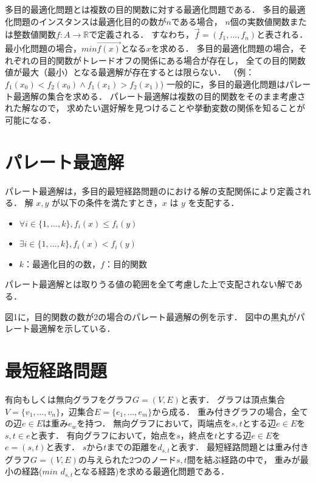 \documentclass[12pt]{optlab-bachelor}
\begin{document}
多目的最適化問題とは複数の目的関数に対する最適化問題である．
多目的最適化問題のインスタンスは最適化目的の数が$n$である場合，
$n$個の実数値関数または整数値関数$f : A \rightarrow \mathbb{R}$で定義される．
すなわち，$\vec{f} = (f_1 , \ldots , f_n)$と表される．
最小化問題の場合，$min\vec{f(x)}$となる$x$を求める．
多目的最適化問題の場合，それぞれの目的関数がトレードオフの関係にある場合が存在し，
全ての目的関数値が最大（最小）となる最適解が存在するとは限らない．
（例：$f_1(x_0) < f_2(x_0) \land f_1(x_1) > f_2(x_1)$)
一般的に，多目的最適化問題はパレート最適解の集合を求める．
パレート最適解は複数の目的関数をそのまま考慮された解なので，
求めたい選好解を見つけることや挙動変数の関係を知ることが可能になる．

\section{パレート最適解}
パレート最適解は，多目的最短経路問題のにおける解の支配関係により定義される．
解 $x,y$ が以下の条件を満たすとき，$x$ は $y$ を支配する．
\begin{itemize}
\item $\forall i \in \{1,\ldots,k\},f_i(x) \le f_i(y)$
\item $\exists i \in \{1,\ldots,k\},f_i(x) < f_i(y)$
\item $k$：最適化目的の数，$f$：目的関数
\end{itemize}
パレート最適解とは取りうる値の範囲を全て考慮した上で支配されない解である．

図1に，目的関数の数が2の場合のパレート最適解の例を示す．
図中の黒丸がパレート最適解を示している．

\section{最短経路問題}
有向もしくは無向グラフをグラフ$G=(V,E)$と表す．
グラフは頂点集合$V=\{v_1,\ldots,v_n\}$，辺集合$E=\{e_1,\ldots,e_m\}$から成る．
重み付きグラフの場合，全ての辺$e\in E$は重み$e_w$を持つ．
無向グラフにおいて，両端点を$s,t$とする辺$e \in E$を$s,t \in e$と表す．
有向グラフにおいて，始点を$s$，終点を$t$とする辺$e \in E$を$e=(s,t)$と表す．
$s$から$t$までの距離を$d_{s,t}$と表す．
最短経路問題とは重み付きグラフ$G=(V,E)$の与えられた2つのノード$s,t$間を結ぶ経路の中で，
重みが最小の経路($min$ $d_{s,t}$となる経路)を求める最適化問題である．
\end{document}
